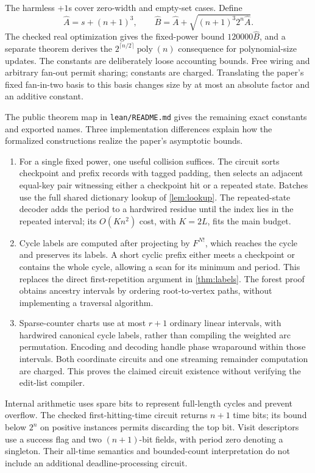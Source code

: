 \documentclass[11pt]{article}
\theoremstyle{definition}
\theoremstyle{remark}
\newcommand{\poly}{\operatorname{poly}}
\numberwithin{equation}{section}
\begin{document}
The harmless $+1$s cover zero-width and empty-set cases.  Define
\[
 \widehat A=s+(n+1)^3,\qquad
 \widehat B=\widehat A+\sqrt{(n+1)^3 2^n\widehat A}.
\]
The checked real optimization gives the fixed-power bound
$120000\widehat B$, and a separate theorem derives the
$2^{\lceil n/2\rceil}\poly(n)$ consequence for polynomial-size updates.
The constants are deliberately loose accounting bounds.  Free wiring
and arbitrary fan-out permit sharing; constants are charged.
Translating the paper's fixed fan-in-two basis to this basis changes
size by at most an absolute factor and an additive constant.

The public theorem map in \texttt{lean/README.md} gives the remaining exact
constants and exported names.  Three implementation differences explain how
the formalized constructions realize the paper's asymptotic bounds.

\begin{enumerate}
\item For a single fixed power, one useful collision suffices.  The circuit
sorts checkpoint and prefix records with tagged padding, then selects an
adjacent equal-key pair witnessing either a checkpoint hit or a repeated
state.  Batches use the full shared dictionary lookup of \cref{lem:lookup}.
The repeated-state decoder adds the period to a hardwired residue until the
index lies in the repeated interval; its $O(Kn^2)$ cost, with $K=2L$, fits
the main budget.
\item Cycle labels are computed after projecting by $F^{N!}$, which reaches
the cycle and preserves its labels.  A short cyclic prefix either meets a
checkpoint or contains the whole cycle, allowing a scan for its minimum and
period.  This replaces the direct first-repetition argument in
\cref{thm:labels}.  The forest proof obtains ancestry intervals by ordering
root-to-vertex paths, without implementing a traversal algorithm.
\item Sparse-counter charts use at most $r+1$ ordinary linear intervals,
with hardwired canonical cycle labels, rather than compiling the weighted
arc permutation.  Encoding and decoding handle phase wraparound within
those intervals.  Both coordinate circuits and one streaming remainder
computation are charged.  This proves the claimed circuit existence without
verifying the edit-list compiler.
\end{enumerate}

Internal arithmetic uses spare bits to represent full-length cycles and
prevent overflow.  The checked first-hitting-time circuit returns $n+1$
time bits; its bound below $2^n$ on positive instances permits discarding
the top bit.  Visit descriptors use a success flag and two $(n+1)$-bit
fields, with period zero denoting a singleton.  Their all-time semantics
and bounded-count interpretation do not include an additional
deadline-processing circuit.
\end{document}
